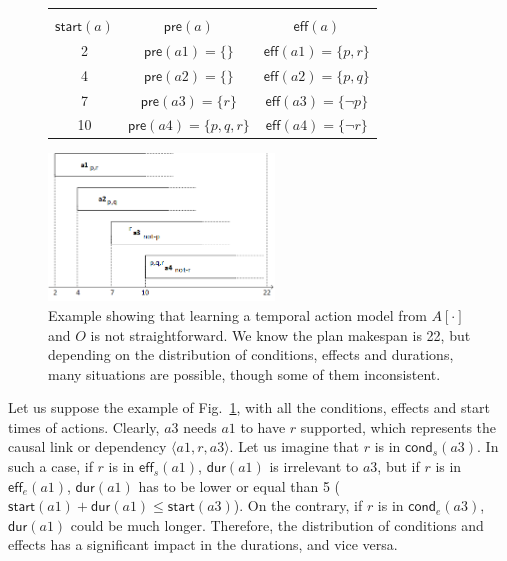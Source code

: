 \documentclass[runningheads]{llncs}
\newcommand{\tup}[1]{{\langle #1 \rangle}}
\newcommand{\pre}{\mathsf{pre}}    %
\newcommand{\eff}{\mathsf{eff}}    %
\newcommand{\cond}{\mathsf{cond}}  %
\newcommand{\dur}{\mathsf{dur}}    %
\newcommand{\start}{\mathsf{start}}%
\begin{document}
\begin{figure}
  \begin{small}
    \begin{tabular}{c| c| c}
\vspace{-4cm}\\
$\start(a)$ &$\pre(a)$ &$\eff(a)$ \\\hline
2 &$\pre(a1)=\{\}$ &$\eff(a1)=\{p,r\}$ \\
4 &$\pre(a2)=\{\}$ &$\eff(a2)=\{p,q\}$ \\
7 &$\pre(a3)=\{r\}$ &$\eff(a3)=\{\neg p\}$ \\
10 &$\pre(a4)=\{p,q,r\}$ &$\eff(a4)=\{\neg r\}$ \\    
  \end{tabular}
  \end{small}    
\includegraphics[width=6cm]{ejemploacciones.png}
\caption{\small Example showing that learning a temporal action model from $A[\cdot]$ and $O$ is not straightforward. We know the plan makespan is 22, but depending on the distribution of conditions, effects and durations, many situations are possible, though some of them inconsistent.}
\label{fig:exampleplantrace}
\end{figure}


Let us suppose the example of Fig.~\ref{fig:exampleplantrace}, with all the conditions, effects and start times of actions. Clearly, $a3$ needs $a1$ to have $r$ supported, which represents the causal link or dependency $\tup{a1,r,a3}$. Let us imagine that $r$ is in $\cond_s(a3)$. In such a case, if $r$ is in $\eff_s(a1)$, $\dur(a1)$ is irrelevant to $a3$, but if $r$ is in $\eff_e(a1)$, $\dur(a1)$ has to be lower or equal than 5 ($\start(a1)+\dur(a1) \leq \start(a3)$). On the contrary, if $r$ is in $\cond_e(a3)$, $\dur(a1)$ could be much longer. Therefore, the distribution of conditions and effects has a significant impact in the durations, and vice versa.
\end{document}
